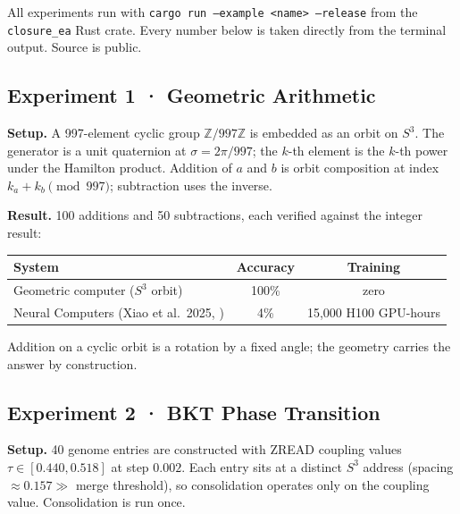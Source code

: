 \documentclass[12pt,a4paper]{article}
\theoremstyle{definition}
\theoremstyle{remark}
\begin{document}
All experiments run with \texttt{cargo run --example <name> --release} from the
\texttt{closure\_ea} Rust crate. Every number below is taken directly from the
terminal output. Source is public.

\subsection{Experiment 1 · Geometric Arithmetic}
\label{app:exp1}

\textbf{Setup.} A 997-element cyclic group $\mathbb{Z}/997\mathbb{Z}$ is
embedded as an orbit on $S^3$. The generator is a unit quaternion at
$\sigma = 2\pi/997$; the $k$-th element is the $k$-th power under the
Hamilton product. Addition of $a$ and $b$ is orbit composition at index
$k_a + k_b \pmod{997}$; subtraction uses the inverse.

\textbf{Result.} 100 additions and 50 subtractions, each verified against
the integer result:

\begin{center}
\begin{tabular}{lcc}
\toprule
System & Accuracy & Training \\
\midrule
Geometric computer ($S^3$ orbit) & 100\% & zero \\
Neural Computers (Xiao et al.\ 2025, \cite{zhuge2026}) & 4\% & 15{,}000 H100 GPU-hours \\
\bottomrule
\end{tabular}
\end{center}

Addition on a cyclic orbit is a rotation by a fixed angle; the geometry
carries the answer by construction.

\subsection{Experiment 2 · BKT Phase Transition}
\label{app:exp2}

\textbf{Setup.} 40 genome entries are constructed with ZREAD coupling values
$\tau \in [0.440, 0.518]$ at step $0.002$. Each entry sits at a distinct $S^3$
address (spacing $\approx 0.157 \gg$ merge threshold), so consolidation
operates only on the coupling value. Consolidation is run once.
\end{document}
